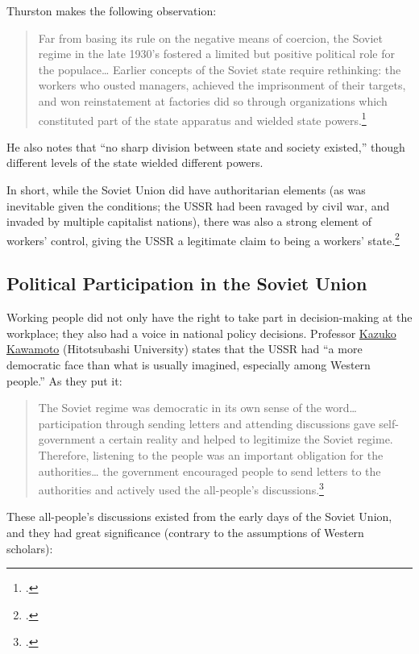 Thurston makes the following observation:

\begin{quote}
Far from basing its rule on the negative means of coercion, the Soviet
regime in the late 1930's fostered a limited but positive political role
for the populace\ldots{} Earlier concepts of the Soviet state require
rethinking: the workers who ousted managers, achieved the imprisonment
of their targets, and won reinstatement at factories did so through
organizations which constituted part of the state apparatus and wielded
  state powers.\footcite{thurston2002reassessing}
\end{quote}

He also notes that ``no sharp division between state and society
existed,'' though different levels of the state wielded different
powers.

In short, while the Soviet Union did have authoritarian elements (as was
inevitable given the conditions; the USSR had been ravaged by civil war,
and invaded by multiple capitalist nations), there was also a strong
element of workers' control, giving the USSR a legitimate claim to being
a workers' state.\footcite{thurston2002reassessing}

\subsection*{Political Participation in the Soviet Union}

Working people did not only have the right to take part in
decision-making at the workplace; they also had a voice in national
policy decisions. Professor
\href{https://researchmap.jp/read0148263/?lang=english}{Kazuko Kawamoto}
(Hitotsubashi University) states that the USSR had ``a more democratic
face than what is usually imagined, especially among Western people.''
As they put it:

\begin{quote}
The Soviet regime was democratic in its own sense of the word\ldots{}
participation through sending letters and attending discussions gave
self-government a certain reality and helped to legitimize the Soviet
regime. Therefore, listening to the people was an important obligation
for the authorities\ldots{} the government encouraged people to send
letters to the authorities and actively used the all-people's
discussions.\footcite{kawamoto2014rethinking}
\end{quote}

These all-people's discussions existed from the early days of the Soviet
Union, and they had great significance (contrary to the assumptions of
Western scholars):

